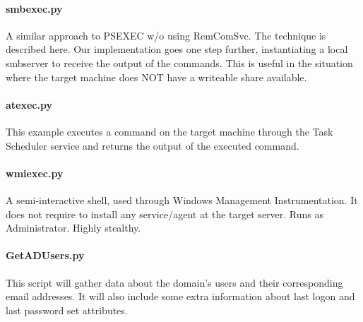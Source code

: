 \paragraph{smbexec.py}
A similar approach to PSEXEC w/o using RemComSvc. The technique is described here. Our implementation goes one step further, instantiating a local smbserver to receive the output of the commands. This is useful in the situation where the target machine does NOT have a writeable share available.

\paragraph{atexec.py}
This example executes a command on the target machine through the Task Scheduler service and returns the output of the executed command.

\paragraph{wmiexec.py}
A semi-interactive shell, used through Windows Management Instrumentation. It does not require to install any service/agent at the target server. Runs as Administrator. Highly stealthy.

\paragraph{GetADUsers.py}
This script will gather data about the domain's users and their corresponding email addresses. 
It will also include some extra information about last logon and last password set attributes.